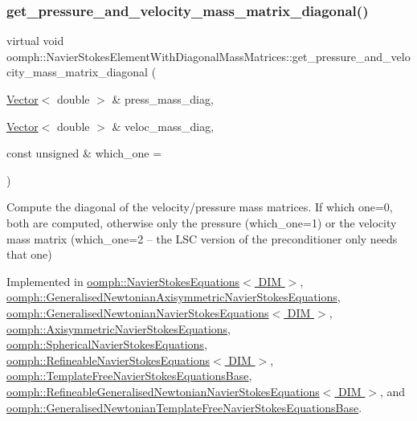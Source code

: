 \subsubsection{\texorpdfstring{get\+\_\+pressure\+\_\+and\+\_\+velocity\+\_\+mass\+\_\+matrix\+\_\+diagonal()}{get\_pressure\_and\_velocity\_mass\_matrix\_diagonal()}}
{\footnotesize\ttfamily virtual void oomph\+::\+Navier\+Stokes\+Element\+With\+Diagonal\+Mass\+Matrices\+::get\+\_\+pressure\+\_\+and\+\_\+velocity\+\_\+mass\+\_\+matrix\+\_\+diagonal (\begin{DoxyParamCaption}\item[{\hyperlink{classoomph_1_1Vector}{Vector}$<$ double $>$ \&}]{press\+\_\+mass\+\_\+diag,  }\item[{\hyperlink{classoomph_1_1Vector}{Vector}$<$ double $>$ \&}]{veloc\+\_\+mass\+\_\+diag,  }\item[{const unsigned \&}]{which\+\_\+one = {} }\end{DoxyParamCaption})\hspace{0.3cm}{\ttfamily [pure virtual]}}



Compute the diagonal of the velocity/pressure mass matrices. If which one=0, both are computed, otherwise only the pressure (which\+\_\+one=1) or the velocity mass matrix (which\+\_\+one=2 -- the L\+SC version of the preconditioner only needs that one) 



Implemented in \hyperlink{classoomph_1_1NavierStokesEquations_a2d6e748dd25be78b65f927cd2b257c55}{oomph\+::\+Navier\+Stokes\+Equations$<$ D\+I\+M $>$}, \hyperlink{classoomph_1_1GeneralisedNewtonianAxisymmetricNavierStokesEquations_a0c4bd2fe53aee0df4fa9b2bf57fb6a89}{oomph\+::\+Generalised\+Newtonian\+Axisymmetric\+Navier\+Stokes\+Equations}, \hyperlink{classoomph_1_1GeneralisedNewtonianNavierStokesEquations_a6a7432333fec18d7e68efc3f99a02f16}{oomph\+::\+Generalised\+Newtonian\+Navier\+Stokes\+Equations$<$ D\+I\+M $>$}, \hyperlink{classoomph_1_1AxisymmetricNavierStokesEquations_ac0c850c7a41b408784f3a103f9aba982}{oomph\+::\+Axisymmetric\+Navier\+Stokes\+Equations}, \hyperlink{classoomph_1_1SphericalNavierStokesEquations_a3cb7aec8278bb92aa731a19777608cac}{oomph\+::\+Spherical\+Navier\+Stokes\+Equations}, \hyperlink{classoomph_1_1RefineableNavierStokesEquations_a94c16c8b4aa810e9e2f8df263654eaed}{oomph\+::\+Refineable\+Navier\+Stokes\+Equations$<$ D\+I\+M $>$}, \hyperlink{classoomph_1_1TemplateFreeNavierStokesEquationsBase_aeb1a1fc53b7e8b25ace065e0b5fd5eff}{oomph\+::\+Template\+Free\+Navier\+Stokes\+Equations\+Base}, \hyperlink{classoomph_1_1RefineableGeneralisedNewtonianNavierStokesEquations_af66689b596908f67bf4af1ad9d6c11eb}{oomph\+::\+Refineable\+Generalised\+Newtonian\+Navier\+Stokes\+Equations$<$ D\+I\+M $>$}, and \hyperlink{classoomph_1_1GeneralisedNewtonianTemplateFreeNavierStokesEquationsBase_a04ab7221559a058af6f0266197094320}{oomph\+::\+Generalised\+Newtonian\+Template\+Free\+Navier\+Stokes\+Equations\+Base}.



